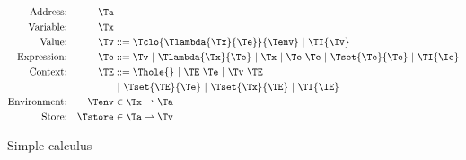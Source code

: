 \begin{figure}[h]
\begin{align*}
\textrm{Address:}     && \Ta          & \\
\textrm{Variable:}    && \Tx          & \\
\textrm{Value:}       && \Tv          & ::=  \Tclo{\Tlambda{\Tx}{\Te}}{\Tenv}
                                        \ |\ \TI{\Iv}\\
\textrm{Expression:}  && \Te          & ::=  \Tv
                                        \ |\ \Tlambda{\Tx}{\Te}
                                        \ |\ \Tx
                                        \ |\ \Te\ \Te
                                        \ |\ \Tset{\Te}{\Te}
                                        \ |\ \TI{\Ie}\\
\textrm{Context:}     && \TE          & ::=  \Thole{}
                                        \ |\ \TE\ \Te
                                        \ |\ \Tv\ \TE\\&&&
                                        \ |\ \Tset{\TE}{\Te}
                                        \ |\ \Tset{\Tx}{\TE}
                                        \ |\ \TI{\IE}\\
\textrm{Environment:} && \Tenv        & \in \Tx \rightharpoonup \Ta \\
\textrm{Store:}       && \Tstore      & \in \Ta \rightharpoonup \Tv \\
\end{align*}
\caption{Simple calculus}
\end{figure}

